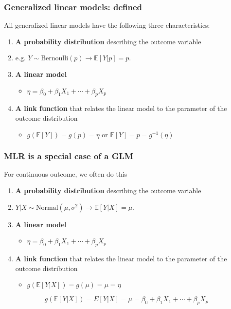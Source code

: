 \documentclass[table]{beamer}\usepackage[]{graphicx}\usepackage[]{color}
\begin{document}

\begin{frame}[fragile]
\frametitle{Generalized linear models: defined}

All generalized linear models have the following three characteristics:
\begin{enumerate}
\item {\bf A probability distribution} describing the outcome variable \\
\bi
\item e.g. $Y \sim \text{Bernoulli}(p) \longrightarrow \mathbb E[Y|p] = p$. 
\ei
\item {\bf A linear model}
\begin{itemize}
\item $\eta = \beta_0+\beta_1 X_1 + \cdots + \beta_p X_p$
\end{itemize}
\item {\bf A link function} that relates the linear model to the parameter of the outcome distribution
\begin{itemize}
\item $g(\mathbb E[Y]) = g(p) = \eta$ or $\mathbb E[Y] = p = g^{-1}(\eta)$
\end{itemize}
\end{enumerate}

\end{frame}



\begin{frame}
\frametitle{MLR is a special case of a GLM}

\begin{block}{For continuous outcome, we often do this}
\begin{enumerate}
\item {\bf A probability distribution} describing the outcome variable \\
\bi
\item $Y|X \sim \text{Normal}(\mu, \sigma^2) \longrightarrow \mathbb E[Y|X] = \mu$. 
\ei
\item {\bf A linear model}
\begin{itemize}
\item $\eta = \beta_0+\beta_1 X_1 + \cdots + \beta_p X_p$
\end{itemize}
\item {\bf A link function} that relates the linear model to the parameter of the outcome distribution
\begin{itemize}
\item $g(\mathbb E[Y|X]) = g(\mu) = \mu = \eta$ 
\end{itemize}
\end{enumerate}
\end{block}

$$g(\mathbb E[Y|X]) = E[Y|X] = \mu = \beta_0+\beta_1 X_1 + \cdots + \beta_p X_p$$

\end{frame}
\end{document}
